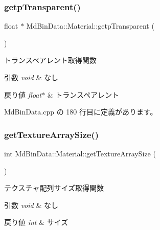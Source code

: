 \subsubsection{\texorpdfstring{getp\+Transparent()}{getpTransparent()}}
{\footnotesize\ttfamily float $\ast$ Md\+Bin\+Data\+::\+Material\+::getp\+Transparent (\begin{DoxyParamCaption}{ }\end{DoxyParamCaption})}



トランスペアレント取得関数 


\begin{DoxyParams}{引数}
{\em void} & なし \\
\hline
\end{DoxyParams}

\begin{DoxyRetVals}{戻り値}
{\em float$\ast$} & トランスペアレント \\
\hline
\end{DoxyRetVals}


 Md\+Bin\+Data.\+cpp の 180 行目に定義があります。

\mbox{\label{class_md_bin_data_1_1_material_a9ac4c6f4a97143645a1b5c78d321ba71}} 
\subsubsection{\texorpdfstring{get\+Texture\+Array\+Size()}{getTextureArraySize()}}
{\footnotesize\ttfamily int Md\+Bin\+Data\+::\+Material\+::get\+Texture\+Array\+Size (\begin{DoxyParamCaption}{ }\end{DoxyParamCaption})}



テクスチャ配列サイズ取得関数 


\begin{DoxyParams}{引数}
{\em void} & なし \\
\hline
\end{DoxyParams}

\begin{DoxyRetVals}{戻り値}
{\em int} & サイズ \\
\hline
\end{DoxyRetVals}


